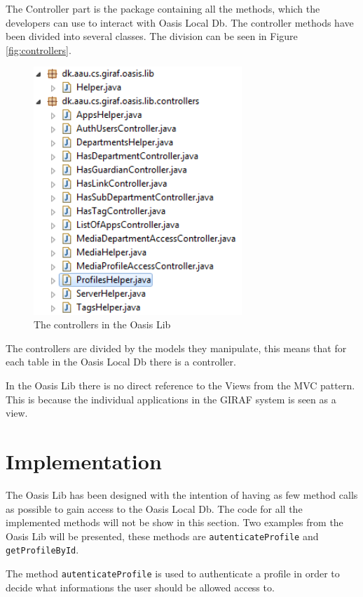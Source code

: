 The Controller part is the package containing all the methods, which the developers can use to interact with Oasis Local Db.
The controller methods have been divided into several classes.
The division can be seen in Figure \vref{fig:controllers}.
\begin{figure}[htbp]
	\centering
		\includegraphics[width=0.7\textwidth]{images/controllers.png}
	\caption{The controllers in the Oasis Lib}
	\label{fig:controllers}
\end{figure}

The controllers are divided by the models they manipulate, this means that for each table in the Oasis Local Db there is a controller.

In the Oasis Lib there is no direct reference to the Views from the MVC pattern.
This is because the individual applications in the GIRAF system is seen as a view.

\section{Implementation}
\label{sec:LibImp}
The Oasis Lib has been designed with the intention of having as few method calls as possible to gain access to the Oasis Local Db.
The code for all the implemented methods will not be show in this section.
Two examples from the Oasis Lib will be presented, these methods are \texttt{autenticateProfile} and \texttt{getProfileById}.


The method \texttt{autenticateProfile} is used to authenticate a profile in order to decide what informations the user should be allowed access to.

